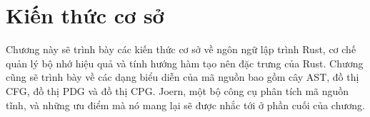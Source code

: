 \chapter{Kiến thức cơ sở}
\label{chap:background}

Chương này sẽ trình bày các kiến thức cơ sở về ngôn ngữ lập trình Rust, cơ chế quản lý bộ nhớ hiệu quả và tính hướng hàm tạo nên đặc trưng của Rust.
Chương cũng sẽ trình bày về các dạng biểu diễn của mã nguồn bao gồm cây AST, đồ thị CFG, đồ thị PDG và đồ thị CPG.
Joern, một bộ công cụ phân tích mã nguồn tĩnh, và những ưu điểm mà nó mang lại sẽ được nhắc tới ở phần cuối của chương.




